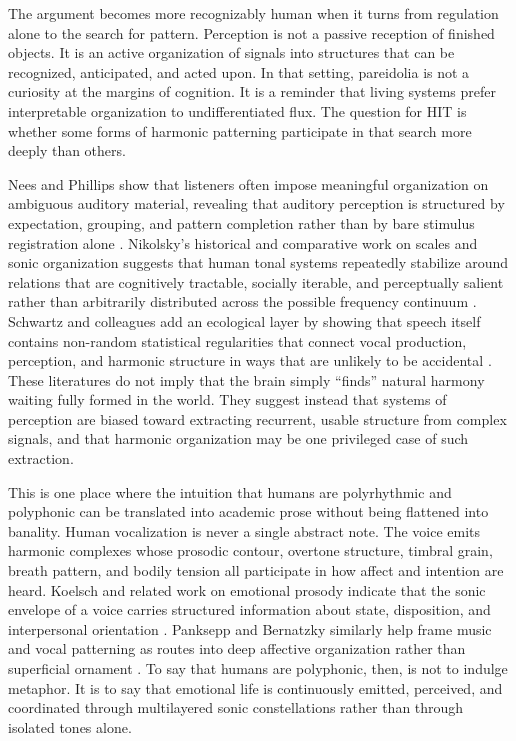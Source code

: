 The argument becomes more recognizably human when it turns from regulation alone to the search for pattern. Perception is not a passive reception of finished objects. It is an active organization of signals into structures that can be recognized, anticipated, and acted upon. In that setting, pareidolia is not a curiosity at the margins of cognition. It is a reminder that living systems prefer interpretable organization to undifferentiated flux. The question for HIT is whether some forms of harmonic patterning participate in that search more deeply than others.

Nees and Phillips show that listeners often impose meaningful organization on ambiguous auditory material, revealing that auditory perception is structured by expectation, grouping, and pattern completion rather than by bare stimulus registration alone \parencite{nees_phillips}. Nikolsky's historical and comparative work on scales and sonic organization suggests that human tonal systems repeatedly stabilize around relations that are cognitively tractable, socially iterable, and perceptually salient rather than arbitrarily distributed across the possible frequency continuum \parencite{nikolsky}. Schwartz and colleagues add an ecological layer by showing that speech itself contains non-random statistical regularities that connect vocal production, perception, and harmonic structure in ways that are unlikely to be accidental \parencite{schwartz_2003}. These literatures do not imply that the brain simply \enquote{finds} natural harmony waiting fully formed in the world. They suggest instead that systems of perception are biased toward extracting recurrent, usable structure from complex signals, and that harmonic organization may be one privileged case of such extraction.

This is one place where the intuition that humans are polyrhythmic and polyphonic can be translated into academic prose without being flattened into banality. Human vocalization is never a single abstract note. The voice emits harmonic complexes whose prosodic contour, overtone structure, timbral grain, breath pattern, and bodily tension all participate in how affect and intention are heard. Koelsch and related work on emotional prosody indicate that the sonic envelope of a voice carries structured information about state, disposition, and interpersonal orientation \parencite{koelsch_2014}. Panksepp and Bernatzky similarly help frame music and vocal patterning as routes into deep affective organization rather than superficial ornament \parencite{panksepp_2002}. To say that humans are polyphonic, then, is not to indulge metaphor. It is to say that emotional life is continuously emitted, perceived, and coordinated through multilayered sonic constellations rather than through isolated tones alone.

